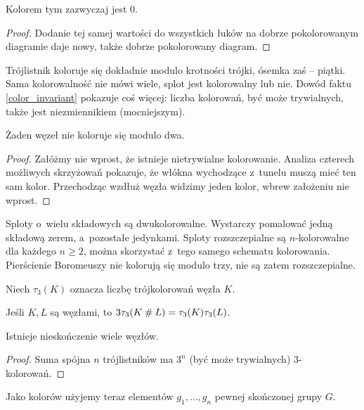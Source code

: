 Kolorem tym zazwyczaj jest $0$.

\begin{proof}
    Dodanie tej samej wartości do wszystkich łuków na dobrze pokolorowanym diagramie daje nowy, także dobrze pokolorowany diagram.
\end{proof}

Trójlistnik koloruje się dokładnie modulo krotności trójki, ósemka zaś -- piątki.
Sama kolorowalność nie mówi wiele, splot jest kolorowalny lub nie.
Dowód faktu \ref{color_invariant} pokazuje coś więcej: liczba kolorowań, być może trywialnych, także jest niezmiennikiem (mocniejszym).

\begin{proposition}
    \label{no_knots_colours_mod_two}
    Żaden węzeł nie koloruje się modulo dwa.
\end{proposition}

\begin{proof}
    Załóżmy nie wprost, że istnieje nietrywialne kolorowanie.
    Analiza czterech możliwych skrzyżowań pokazuje,
    że włókna wychodzące z~tunelu muszą mieć ten sam kolor.
    Przechodząc wzdłuż węzła widzimy jeden kolor, wbrew założeniu nie wprost.
\end{proof}

Sploty o~wielu składowych są dwukolorowalne.
Wystarczy pomalować jedną składową zerem, a~pozostałe jedynkami.
Sploty rozszczepialne są $n$-kolorowalne dla każdego $n \ge 2$, można skorzystać z~tego samego schematu kolorowania.
Pierścienie Boromeuszy nie kolorują się modulo trzy, nie są zatem rozszczepialne.


Niech $\tau_3(K)$ oznacza liczbę trójkolorowań węzła $K$.

\begin{proposition}
    Jeśli $K, L$ są węzłami, to $3\tau_3(K \mathbin{\#} L) = \tau_3(K)\tau_3(L)$.
\end{proposition}

\begin{corollary}
    Istnieje nieskończenie wiele węzłów.
\end{corollary}

\begin{proof}
    Suma spójna $n$ trójlistników ma $3^n$ (być może trywialnych) $3$-kolorowań.
\end{proof}

Jako kolorów użyjemy teraz elementów $g_1, \ldots, g_n$ pewnej skończonej grupy $G$.

